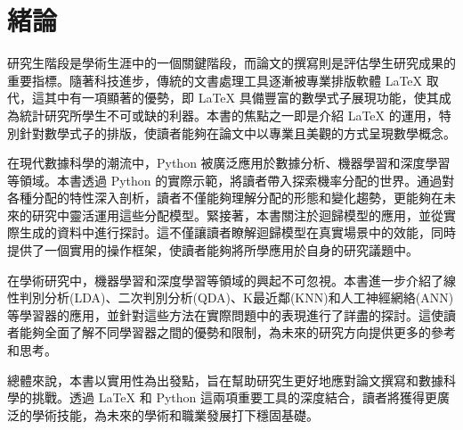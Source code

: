 \chapter*{緒論}
研究生階段是學術生涯中的一個關鍵階段，而論文的撰寫則是評估學生研究成果的重要指標。隨著科技進步，傳統的文書處理工具逐漸被專業排版軟體 LaTeX 取代，這其中有一項顯著的優勢，即 LaTeX 具備豐富的數學式子展現功能，使其成為統計研究所學生不可或缺的利器。本書的焦點之一即是介紹 LaTeX 的運用，特別針對數學式子的排版，使讀者能夠在論文中以專業且美觀的方式呈現數學概念。

在現代數據科學的潮流中，Python 被廣泛應用於數據分析、機器學習和深度學習等領域。本書透過 Python 的實際示範，將讀者帶入探索機率分配的世界。通過對各種分配的特性深入剖析，讀者不僅能夠理解分配的形態和變化趨勢，更能夠在未來的研究中靈活運用這些分配模型。緊接著，本書關注於迴歸模型的應用，並從實際生成的資料中進行探討。這不僅讓讀者瞭解迴歸模型在真實場景中的效能，同時提供了一個實用的操作框架，使讀者能夠將所學應用於自身的研究議題中。

在學術研究中，機器學習和深度學習等領域的興起不可忽視。本書進一步介紹了線性判別分析(LDA)、二次判別分析(QDA)、K最近鄰(KNN)和人工神經網絡(ANN)等學習器的應用，並針對這些方法在實際問題中的表現進行了詳盡的探討。這使讀者能夠全面了解不同學習器之間的優勢和限制，為未來的研究方向提供更多的參考和思考。

總體來說，本書以實用性為出發點，旨在幫助研究生更好地應對論文撰寫和數據科學的挑戰。透過 LaTeX 和 Python 這兩項重要工具的深度結合，讀者將獲得更廣泛的學術技能，為未來的學術和職業發展打下穩固基礎。